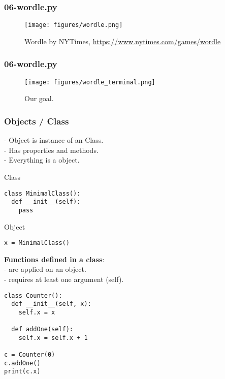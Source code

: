 \documentclass{beamer}
\begin{document}
\begin{frame}[fragile]
	\frametitle{06-wordle.py}
	\begin{figure}
		\texttt{[image: figures/wordle.png]}
		\caption{Wordle by NYTimes, \url{https://www.nytimes.com/games/wordle}}
	\end{figure}
\end{frame}

\begin{frame}[fragile]
	\frametitle{06-wordle.py}
	\begin{figure}
		\texttt{[image: figures/wordle\_terminal.png]}
		\caption{Our goal.}
	\end{figure}
\end{frame}

\begin{frame}[fragile]
	\frametitle{Objects / Class}
	- Object is instance of an Class.\\
	- Has properties and methods. \\
	- Everything is a object.\\
\begin{block}{Class}
	
	\begin{verbatim}
class MinimalClass():
  def __init__(self):
    pass
	\end{verbatim}
\end{block}	
\begin{block}{Object}
\begin{verbatim}
x = MinimalClass()
\end{verbatim}	
\end{block}	
\end{frame}

\begin{frame}[fragile]
\textbf{Functions defined in a class}:\\
- are applied on an object.\\
- requires at least one argument (self).

\begin{example}
 \begin{verbatim}
class Counter():
  def __init__(self, x):
    self.x = x

  def addOne(self):
    self.x = self.x + 1
    
c = Counter(0)
c.addOne()
print(c.x)
\end{verbatim}	
\end{example}
\end{frame}
\end{document}
